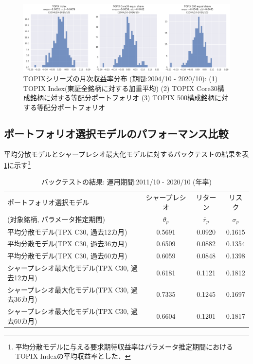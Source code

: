 \documentclass[dvipdfmx,autodetect-engine]{jsarticle}
\begin{document}
\begin{figure}[htbp]
    \begin{center}
        \includegraphics[width=0.95\hsize]{./figures/topix_ror_dist_20041031-20201031.png}
        \caption{TOPIXシリーズの月次収益率分布
        (期間:2004/10 - 2020/10): 
        (1) TOPIX Index(東証全銘柄に対する加重平均)
        (2) TOPIX Core30構成銘柄に対する等配分ポートフォリオ
        (3) TOPIX 500構成銘柄に対する等配分ポートフォリオ}
        \label{fig:two}
    \end{center}
\end{figure}

\subsection{ポートフォリオ選択モデルのパフォーマンス比較}

平均分散モデルとシャープレシオ最大化モデルに対するバックテストの結果を表\ref{table:backtest_result}に示す\footnote{平均分散モデルに与える要求期待収益率はパラメータ推定期間におけるTOPIX Indexの平均収益率とした．}

\begin{table}[hb]
    \caption{バックテストの結果: 運用期間:2011/10 - 2020/10 (年率)}
    \label{table:backtest_result}
    \centering
    \begin{tabular}{lccc}
        \hline
        ポートフォリオ選択モデル & シャープレシオ & リターン & リスク \\
        (対象銘柄, パラメータ推定期間) & $\theta_p$ & $\bar{r}_p$ & $\sigma_p$ \\
        \hline \hline
        平均分散モデル(TPX C30, 過去12カ月) & 0.5691 & 0.0920 & 0.1615 \\
        平均分散モデル(TPX C30, 過去36カ月) & 0.6509 & 0.0882 & 0.1354 \\
        平均分散モデル(TPX C30, 過去60カ月) & 0.6059 & 0.0848 & 0.1398 \\
        シャープレシオ最大化モデル(TPX C30, 過去12カ月) & 0.6181 & 0.1121 & 0.1812 \\
        シャープレシオ最大化モデル(TPX C30, 過去36カ月) & 0.7335 & 0.1245 & 0.1697 \\
        シャープレシオ最大化モデル(TPX C30, 過去60カ月) & 0.6604 & 0.1201 & 0.1817 \\
        \hline
    \end{tabular}
\end{table}
\end{document}
